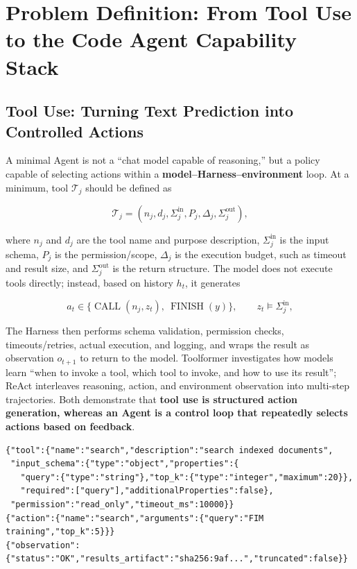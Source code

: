 \documentclass[10pt,a4paper,UTF8,fontset=none]{ctexart}
\begin{document}
\clearpage
\section{Problem Definition: From Tool Use to the Code Agent Capability Stack}

\subsection{Tool Use: Turning Text Prediction into Controlled Actions}

A minimal Agent is not a ``chat model capable of reasoning,'' but a policy capable of selecting actions within a \textbf{model--Harness--environment} loop. At a minimum, tool $\mathcal{T}_j$ should be defined as

\begin{equation}
\mathcal{T}_j=(n_j,d_j,\Sigma^{\mathrm{in}}_j,P_j,\Delta_j,\Sigma^{\mathrm{out}}_j),
\label{eq:tool-contract}
\end{equation}

where $n_j$ and $d_j$ are the tool name and purpose description, $\Sigma^{\mathrm{in}}_j$ is the input schema, $P_j$ is the permission/scope, $\Delta_j$ is the execution budget, such as timeout and result size, and $\Sigma^{\mathrm{out}}_j$ is the return structure. The model does not execute tools directly; instead, based on history $h_t$, it generates

\begin{equation}
a_t\in\{\operatorname{CALL}(n_j,z_t),\ \operatorname{FINISH}(y)\},\qquad z_t\models\Sigma^{\mathrm{in}}_j,
\label{eq:tool-action}
\end{equation}

The Harness then performs schema validation, permission checks, timeouts/retries, actual execution, and logging, and wraps the result as observation $o_{t+1}$ to return to the model. Toolformer investigates how models learn ``when to invoke a tool, which tool to invoke, and how to use its result''\cite{schick2023toolformer}; ReAct interleaves reasoning, action, and environment observation into multi-step trajectories\cite{yao2023react}. Both demonstrate that \textbf{tool use is structured action generation, whereas an Agent is a control loop that repeatedly selects actions based on feedback}.

\begin{lstlisting}[style=codeblock,caption={A minimal search-tool contract and one invocation}]
{"tool":{"name":"search","description":"search indexed documents",
 "input_schema":{"type":"object","properties":{
   "query":{"type":"string"},"top_k":{"type":"integer","maximum":20}},
   "required":["query"],"additionalProperties":false},
 "permission":"read_only","timeout_ms":10000}}
{"action":{"name":"search","arguments":{"query":"FIM training","top_k":5}}}
{"observation":{"status":"OK","results_artifact":"sha256:9af...","truncated":false}}
\end{lstlisting}
\end{document}
